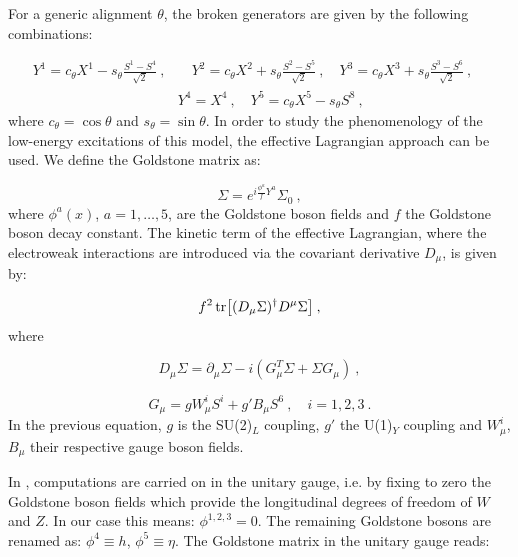 For a generic alignment $\theta$, the broken generators are given by the following combinations: 

\begin{equation}
\begin{split}
Y^1 = c_{\theta} X^1 - s_{\theta} \frac{S^1-S^4}{\sqrt  2} \: , & \quad Y^2 = c_{\theta} X^2 + s_{\theta} \frac{S^2-S^5}{\sqrt  2} \: , \quad Y^3 = c_{\theta} X^3 + s_{\theta} \frac{S^3-S^6}{\sqrt  2} \: , \quad \\
& Y^4 = X^4 \: ,  \quad  Y^5 = c _{\theta} X^5 - s_{\theta} S^8  \: ,
\end{split}
\end{equation}
%
where $c _{\theta} = \cos \theta$ and $s _{\theta} = \sin \theta$. 
In order to study the phenomenology of the low-energy excitations of this model, the effective Lagrangian approach can be used. We define the Goldstone matrix as:

\begin{equation}
\Sigma = e^{i \frac{\phi^a}{f} Y^a} \Sigma_0 \: ,
\end{equation}
%
where $\phi^a(x)$, $a = 1, \dots , 5$, are the Goldstone boson fields and $f$ the Goldstone boson decay constant.
The kinetic term of the effective Lagrangian, where the electroweak interactions are introduced via the covariant derivative $D_{\mu}$, is given by:

\begin{equation}
f^2 \tr [(D_{\mu} \Sigma)^{\dagger} D^{\mu} \Sigma ] \: ,
\label{eff_lagrangian}
\end{equation}
%
where

\begin{equation}
D_{\mu} \Sigma = \partial_{\mu} \Sigma -i (G_{\mu}^T \Sigma + \Sigma G_{\mu}) \: ,
\end{equation}

\begin{equation}
G_{\mu} = g W^i_{\mu} S^i + g' B_{\mu} S^6 \: , \quad i = 1,2,3 \: .
\end{equation}
%
In the previous equation, $g$ is the SU(2)$_L$ coupling, $g'$ the U(1)$_Y$ coupling and $W^i_{\mu}$, $B_{\mu}$ their respective gauge boson fields.

In \cite{Cacciapaglia:2014uja}, computations are carried on in the unitary gauge, i.e. by fixing to zero the Goldstone boson fields which provide the longitudinal degrees of freedom of $W$ and $Z$. In our case this means: $\phi^{1,2,3} = 0$. The remaining Goldstone bosons are renamed as: $\phi^4 \equiv h$, $\phi^5 \equiv \eta$. The Goldstone matrix in the unitary gauge reads:

